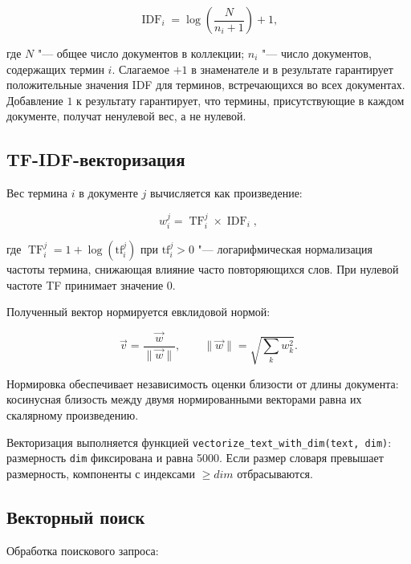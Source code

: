 \begin{equation}
	\operatorname{IDF}_i = \log\left(\frac{N}{n_i + 1}\right) + 1,
	\label{eq:idf_full}
\end{equation}

где $N$ "--- общее число документов в коллекции; $n_i$ "--- число документов,
содержащих термин $i$. Слагаемое $+1$ в знаменателе и в результате гарантирует
положительные значения IDF для терминов, встречающихся во всех документах.
Добавление $1$ к результату гарантирует, что термины, присутствующие в каждом
документе, получат ненулевой вес, а не нулевой.

\subsection{TF-IDF-векторизация}

Вес термина $i$ в документе $j$ вычисляется как произведение:

\begin{equation}
	w^{j}_{i} = \operatorname{TF}^{j}_{i} \times \operatorname{IDF}_i,
	\label{eq:tfidf_full}
\end{equation}

где $\operatorname{TF}^{j}_{i} = 1 + \log(\text{tf}^{j}_{i})$ при
$\text{tf}^{j}_{i} > 0$ "--- логарифмическая нормализация частоты термина,
снижающая влияние часто повторяющихся слов. При нулевой частоте TF принимает
значение $0$.

Полученный вектор нормируется евклидовой нормой:

\begin{equation}
	\vec{v} = \frac{\vec{w}}{\lVert \vec{w} \rVert},
	\qquad
	\lVert \vec{w} \rVert = \sqrt{\sum_{k} w_k^2}.
	\label{eq:vector_norm}
\end{equation}

Нормировка обеспечивает независимость оценки близости от длины документа:
косинусная близость между двумя нормированными векторами равна их скалярному
произведению.

Векторизация выполняется функцией \texttt{vectorize\_text\_with\_dim(text, dim)}:
размерность \texttt{dim} фиксирована и равна 5000. Если размер словаря превышает
размерность, компоненты с индексами $\ge dim$ отбрасываются.

\subsection{Векторный поиск}

Обработка поискового запроса:

